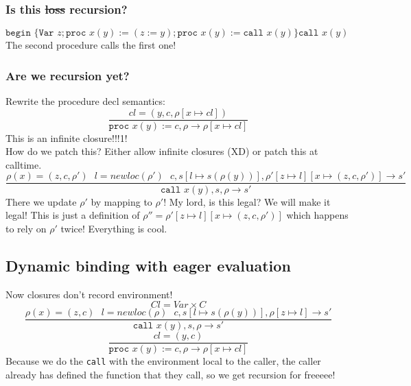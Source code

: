 \documentclass{article}
\begin{document}
\subsubsection{Is this \st{loss} recursion?}
$ \texttt{begin }\{\texttt{Var }z;\texttt{proc }x(y):=(z:=y);\texttt{proc }x(y):=\texttt{call }x(y)\} \texttt{call }x(y) $
The second procedure calls the first one!
\subsubsection{Are we recursion yet?}
Rewrite the procedure decl semantics:
$$\frac{
	cl=(y,c,\rho[x\mapsto cl])
}{\texttt{proc }x(y):=c,\rho \rightarrow \rho[x\mapsto cl]}$$
This is an infinite closure!!!1!\\
How do we patch this? Either allow infinite closures (XD) or patch this at calltime.
$$\frac{
	\rho(x)=(z,c,\rho')\ \ \ 
	l = newloc(\rho')\ \ \ 
	c,s[l\mapsto s(\rho(y))],\rho'[z\mapsto l][x\mapsto(z,c,\rho')] \rightarrow s'
}{\texttt{call }x(y),s,\rho \rightarrow s'}$$
There we update $ \rho' $ by mapping to $ \rho' $! My lord, is this legal? We will make it legal! This is just a definition of $ \rho'' = \rho'[z\mapsto l][x\mapsto(z,c,\rho')] $ which happens to rely on $\rho'$ twice! Everything is cool.
\subsection{Dynamic binding with eager evaluation}
Now closures don't record environment!
$$Cl=Var\times C$$
$$\frac{
	\rho(x)=(z,c)\ \ \ 
	l = newloc(\rho)\ \ \ 
	c,s[l\mapsto s(\rho(y))],\rho[z\mapsto l] \rightarrow s'
}{\texttt{call }x(y),s,\rho \rightarrow s'}$$
$$\frac{
	cl=(y,c)
}{\texttt{proc }x(y):=c,\rho \rightarrow \rho[x\mapsto cl]}$$
Because we do the \texttt{call} with the environment local to the caller, the caller already has defined the function that they call, so we get recursion for freeeee!
\end{document}
